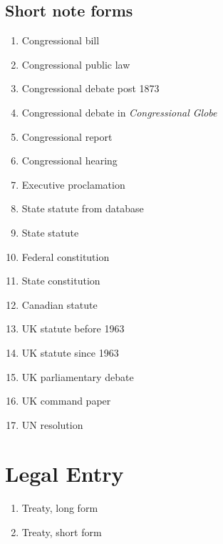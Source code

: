 \documentclass[a4paper,12pt]{article}
\begin{document}
\subsection*{Short note forms}
\label{legis:short}
\begin{enumerate}\setlength{\parskip}{-4pt}
\setcounter{enumi}{32}
\item Congressional bill\autocite{congress:bill}
\item Congressional public law\autocite{congress:publiclaw}
\item Congressional debate post 1873\autocite{congress:debate:new}
\item Congressional debate in \emph{Congressional
    Globe}\autocite{congress:debate:globe}
\item Congressional report\autocite{congress:report}
\item Congressional hearing\autocite{congress:hearing}
\item Executive proclamation\autocite{executive:proclamation}
\item State statute from database\autocite{state:statute:ky}
\item State statute\autocite{state:statute:okla}
\item Federal constitution\autocite{constitution:federal}
\item State constitution\autocite{constitution:arkansas}
\item Canadian statute\autocite{canada:statute}
\item UK statute before 1963\autocite{uk:statute:regnal}
\item UK statute since 1963\autocite{uk:statute}
\item UK parliamentary debate\autocite{uk:hansard}
\item UK command paper\autocite[15--16]{uk:command}
\item UN resolution\autocite{un:resolution}
\end{enumerate}

\section*{Legal Entry}
\label{legal}

\begin{enumerate}\setlength{\parskip}{-4pt}
\setcounter{enumi}{49}
\item Treaty, long form\autocite[45]{treaty}
\item Treaty, short form\autocite[46]{treaty}
\end{enumerate}

\nocite{bluebook}

\printshorthands


\printbibliography[notkeyword=original]
\end{document}
